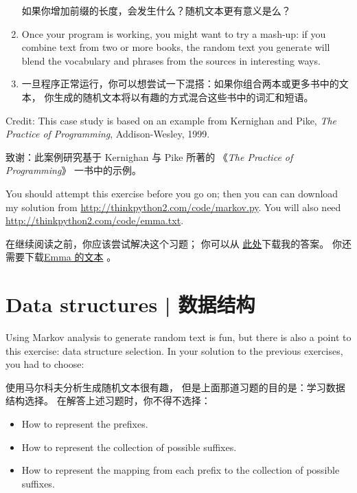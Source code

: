\begin{exercise}
\begin{enumerate}
如果你增加前缀的长度，会发生什么？随机文本更有意义是么？

\item Once your program is working, you might want to try a mash-up:
if you combine text from two or more books, the random
text you generate will blend the vocabulary and phrases from
the sources in interesting ways.

\item 一旦程序正常运行，你可以想尝试一下混搭：如果你组合两本或更多书中的文本，
   你生成的随机文本将以有趣的方式混合这些书中的词汇和短语。


\end{enumerate}

Credit: This case study is based on an example from Kernighan and
Pike, {\em The Practice of Programming}, Addison-Wesley, 1999.

致谢：此案例研究基于 Kernighan 与 Pike 所著的 《{\em The Practice of
Programming}》 一书中的示例。

\end{exercise}
You should attempt this exercise before you go on; then you can can
download my solution from \url{http://thinkpython2.com/code/markov.py}.
You will also need \url{http://thinkpython2.com/code/emma.txt}.

在继续阅读之前，你应该尝试解决这个习题；
你可以从 \href{http://thinkpython2.com/code/markov.py}{此处}下载我的答案。
你还需要下载\href{http://thinkpython2.com/code/emma.txt}{Emma 的文本} 。

\section{Data structures  |  数据结构}

Using Markov analysis to generate random text is fun, but there is
also a point to this exercise: data structure selection.  In your
solution to the previous exercises, you had to choose:

使用马尔科夫分析生成随机文本很有趣，
但是上面那道习题的目的是：学习数据结构选择。
在解答上述习题时，你不得不选择：

\begin{itemize}
\item How to represent the prefixes.
\item How to represent the collection of possible suffixes.
\item How to represent the mapping from each prefix to
the collection of possible suffixes.
\end{itemize}

